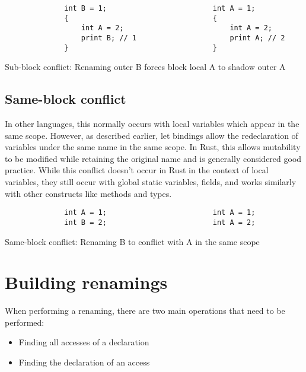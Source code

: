 \begin{fig}[H]
\begin{verbatim}
              int B = 1;                         int A = 1;
              {                                  {
                  int A = 2;                         int A = 2;
                  print B; // 1                      print A; // 2
              }                                  }
\end{verbatim}
\caption{Sub-block conflict: Renaming outer B forces block local A to shadow outer A}
\label{Fig:sub}
\end{fig}

\subsection{Same-block conflict}
In other languages, this normally occurs with local variables which appear in the same scope. However, as described earlier, let bindings allow the redeclaration of variables under the same name in the same scope. In Rust, this allows mutability to be modified while retaining the original name and is generally considered good practice. While this conflict doesn't occur in Rust in the context of local variables, they still occur with global static variables, fields, and works similarly with other constructs like methods and types.

\begin{fig}[H]
\begin{verbatim}
              int A = 1;                         int A = 1;
              int B = 2;                         int A = 2;
\end{verbatim}
\caption{Same-block conflict: Renaming B to conflict with A in the same scope}
\label{Fig:same}
\end{fig}


\section{Building renamings}\label{S:br}
When performing a renaming, there are two main operations that need to be performed:
\begin{itemize}
\item Finding all accesses of a declaration
\item Finding the declaration of an access
\end{itemize}


